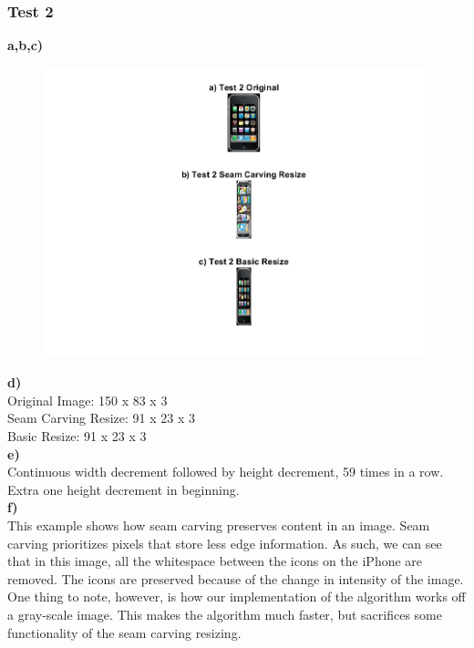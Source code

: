 \documentclass[12pt]{article}
\begin{document}
\newpage
\subsubsection*{Test 2}
\textbf{a,b,c)}
\begin{figure}[H]
  \includegraphics[width=\linewidth]{PS1_Q6_2.png}
\end{figure}

\noindent
\textbf{d)} \\
Original Image: 150 x 83 x 3 \\
Seam Carving Resize: 91 x 23 x 3 \\
Basic Resize: 91 x 23 x 3 \\

\noindent
\textbf{e)} \\
Continuous width decrement followed by height decrement, 59 times in a row. Extra one height decrement in beginning. \\

\noindent
\textbf{f)} \\
This example shows how seam carving preserves content in an image. Seam carving prioritizes pixels that store less edge information. As such, we can see that in this image, all the whitespace between the icons on the iPhone are removed. The icons are preserved because of the change in intensity of the image. One thing to note, however, is how our implementation of the algorithm works off a gray-scale image. This makes the algorithm much faster, but sacrifices some functionality of the seam carving resizing.

\newpage
\end{document}
